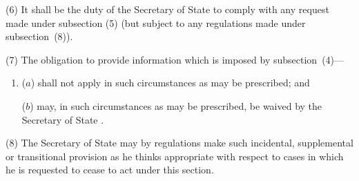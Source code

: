 \documentclass[12pt,a4paper]{article}
\begin{document}
(6) It shall be the duty of the 
Secretary of State  %
to comply with any request made under subsection (5)  (but subject to any regulations made under subsection~(8)).

(7) The obligation to provide information which is imposed by subsection~(4)—
\begin{enumerate}\item[]
($a$) shall not apply in such circumstances as may be prescribed; and

($b$) may, in such circumstances as may be prescribed, be waived by the 
Secretary of State%
.
\end{enumerate}

(8) The Secretary of State may by regulations make such incidental, supplemental or transitional provision as he thinks appropriate with respect to cases in which he is requested to cease to act under this section.

%
\end{document}
